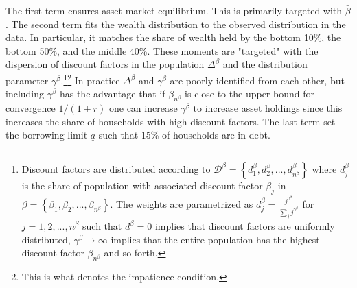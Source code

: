 \vspace{0.7cm}
The first term ensures asset market equilibrium. This is primarily targeted with $\bar{\beta}$. The second term fits the wealth distribution to the observed distribution in the data. In particular, it matches the share of wealth held by the bottom 10\%, the bottom 50\%, and the middle 40\%. These moments are "targeted" with the dispersion of discount factors in the population $\Delta^{\beta}$ and the distribution parameter $\gamma^{\beta}$.\footnote{Discount factors are distributed according to $\mathcal{D}^{\beta}=\left\{ d_{1}^{\beta},d_{2}^{\beta},...,d_{n^{\beta}}^{\beta}\right\}$ where $d_{j}^{\beta}$ is the share of population with associated discount factor $\beta_j$ in $\beta=\left\{ \beta_{1},\beta_{2},...,\beta_{n^{\beta}}\right\}$. The weights are parametrized as $d_{j}^{\beta}=\frac{j^{\gamma^{\beta}}}{\sum_{j}j^{\gamma^{\beta}}}$ for $j=1,2,...,n^{\beta}$ such that $d^{\beta}=0$ implies that discount factors are uniformly distributed, $\gamma^{\beta}\rightarrow\infty$ implies that the entire population has the highest discount factor $\beta_{n^{\beta}}$ and so forth.}\footnote{This is what \citet{carroll2009precautionary} denotes the impatience condition.} In practice $\Delta^{\beta}$ and $\gamma^{\beta}$ are poorly identified from each other, but including $\gamma^{\beta}$ has the advantage that if $\beta_{n^{\beta}}$ is close to the upper bound for convergence $1/(1+r)$ one can increase $\gamma^{\beta}$ to increase asset holdings since this increases the share of households with high discount factors. The last term set the borrowing limit $\underline{a}$ such that 15\% of households are in debt.  \\




